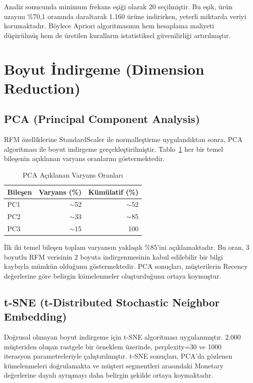 \documentclass[conference]{IEEEtran}
\begin{document}
Analiz sonucunda minimum frekans eşiği olarak 20 seçilmiştir. Bu eşik, ürün uzayını \%70,1 oranında daraltarak 1.160 ürüne indirirken, yeterli miktarda veriyi korumaktadır. Böylece Apriori algoritmasının hem hesaplama maliyeti düşürülmüş hem de üretilen kuralların istatistiksel güvenilirliği artırılmıştır.

\section{Boyut İndirgeme (Dimension Reduction)}

\subsection{PCA (Principal Component Analysis)}

RFM özelliklerine StandardScaler ile normalleştirme uygulandıktan sonra, PCA algoritması ile boyut indirgeme gerçekleştirilmiştir. Tablo~\ref{tab:pca} her bir temel bileşenin açıklanan varyans oranlarını göstermektedir.

\begin{table}[h]
\centering
\caption{PCA Açıklanan Varyans Oranları}
\label{tab:pca}
\begin{tabular}{lrr}
\toprule
\textbf{Bileşen} & \textbf{Varyans (\%)} & \textbf{Kümülatif (\%)} \\
\midrule
PC1 & $\sim$52 & $\sim$52 \\
PC2 & $\sim$33 & $\sim$85 \\
PC3 & $\sim$15 & 100 \\
\bottomrule
\end{tabular}
\end{table}

İlk iki temel bileşen toplam varyansın yaklaşık \%85'ini açıklamaktadır. Bu oran, 3 boyutlu RFM verisinin 2 boyuta indirgenmesinin kabul edilebilir bir bilgi kaybıyla mümkün olduğunu göstermektedir. PCA sonuçları, müşterilerin Recency değerlerine göre belirgin kümelenmeler oluşturduğunu ortaya koymuştur.

\subsection{t-SNE (t-Distributed Stochastic Neighbor Embedding)}

Doğrusal olmayan boyut indirgeme için t-SNE algoritması uygulanmıştır. 2.000 müşteriden oluşan rastgele bir örneklem üzerinde, perplexity=30 ve 1000 iterasyon parametreleriyle çalıştırılmıştır. t-SNE sonuçları, PCA'da gözlenen kümelenmeleri doğrulamakta ve müşteri segmentleri arasındaki Monetary değerlerine dayalı ayrışmayı daha belirgin şekilde ortaya koymaktadır.
\end{document}
